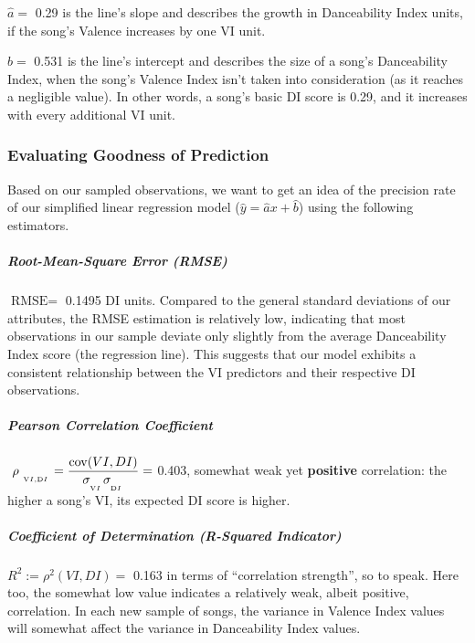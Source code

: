 \documentclass[
]{article}
\begin{document}
\(\hat a =\) 0.29 is the line's slope and describes the growth in
Danceability Index units, if the song's Valence increases by one VI
unit.

\(\hat b =\) 0.531 is the line's intercept and describes the size of a
song's Danceability Index, when the song's Valence Index isn't taken
into consideration (as it reaches a negligible value). In other words, a
song's basic DI score is 0.29, and it increases with every additional VI
unit.

\hypertarget{evaluating-goodness-of-prediction}{%
\subsubsection{Evaluating Goodness of
Prediction}\label{evaluating-goodness-of-prediction}}

Based on our sampled observations, we want to get an idea of the
precision rate of our simplified linear regression model
(\(\hat y = \hat a x + \hat b\)) using the following estimators.

\hypertarget{root-mean-square-error-rmse}{%
\subparagraph{Root-Mean-Square Error
(RMSE)}\label{root-mean-square-error-rmse}}

\(\text {RMSE}=\) 0.1495 DI units. Compared to the general standard
deviations of our attributes, the RMSE estimation is relatively low,
indicating that most observations in our sample deviate only slightly
from the average Danceability Index score (the regression line). This
suggests that our model exhibits a consistent relationship between the
VI predictors and their respective DI observations.

\hypertarget{pearson-correlation-coefficient}{%
\subparagraph{Pearson Correlation
Coefficient}\label{pearson-correlation-coefficient}}

\(\ {\displaystyle \rho \ _{_{_{_{{\text VI},{\text DI}}}}}={\frac{\operatorname {cov} (VI,D I)}{\sigma _{_{_{_{{\text VI}}}}} \sigma _{_{_{_{{\text DI}}}}}}}}=\)
0.403, somewhat weak yet \textbf{positive} correlation: the higher a
song's VI, its expected DI score is higher.

\hypertarget{coefficient-of-determination-r-squared-indicator}{%
\subparagraph{Coefficient of Determination (R-Squared
Indicator)}\label{coefficient-of-determination-r-squared-indicator}}

\(R^2:= {\rho}^2 (VI,DI)=\) 0.163 in terms of ``correlation strength'',
so to speak. Here too, the somewhat low value indicates a relatively
weak, albeit positive, correlation. In each new sample of songs, the
variance in Valence Index values will somewhat affect the variance in
Danceability Index values.
\end{document}
